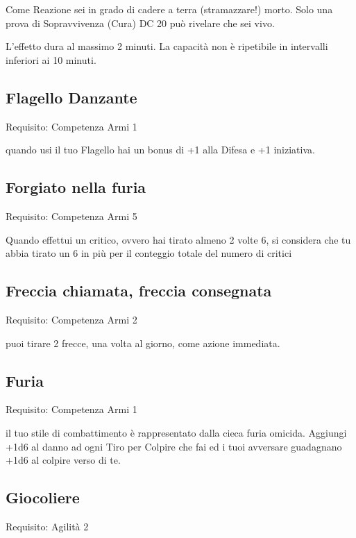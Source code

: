\documentclass[a4paper,11pt,twoside,openany]{book}
\begin{document}
Come Reazione sei in grado di cadere a terra (stramazzare!) morto. Solo una prova di Sopravvivenza (Cura) DC 20 può rivelare che sei vivo.

L'effetto dura al massimo 2 minuti. La capacità non è ripetibile in intervalli inferiori ai 10 minuti.

\subsection{Flagello Danzante}

Requisito: Competenza Armi 1

quando usi il tuo Flagello hai un bonus di +1 alla Difesa e +1 iniziativa.

\subsection{Forgiato nella furia}

Requisito: Competenza Armi 5

Quando effettui un critico, ovvero hai tirato almeno 2 volte 6, si considera che tu abbia tirato un 6 in più per il conteggio totale del numero di critici

\subsection{Freccia chiamata, freccia consegnata}

Requisito: Competenza Armi 2

puoi tirare 2 frecce, una volta al giorno, come azione immediata.

\subsection{Furia}

Requisito: Competenza Armi 1

il tuo stile di combattimento è rappresentato dalla cieca furia omicida. Aggiungi +1d6 al danno ad ogni Tiro per Colpire che fai ed i tuoi avversare guadagnano +1d6 al colpire verso di te.

\subsection{Giocoliere}

Requisito: Agilità 2
\end{document}
